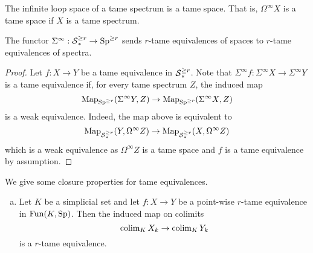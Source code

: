 \begin{remark}
		The infinite loop space of a tame spectrum is a tame space. That is, $\Omega^{\infty}X$ is a tame space if $X$ is a tame spectrum.
\end{remark}




\begin{lemma}
\label{Suspension preserves tame equivalence}
	The functor $\Sigma^{\infty}:\operatorname{\mathcal{S}}^{\geq r}_{*} \to \operatorname{Sp}^{\geq r}$ sends $r$-tame equivalences of spaces to $r$-tame equivalences of spectra.
\end{lemma}
\begin{proof}
	Let $f:X\to Y$ be a tame equivalence in $\operatorname{\mathcal{S}}^{\geq r}_{*}$. Note that $\Sigma^{\infty}f: \Sigma^{\infty}X \to \Sigma^{\infty}Y$ is a tame equivalence if, for every tame spectrum $Z$, the induced map
	$$
	\operatorname{Map}_{\operatorname{Sp}^{\geq r}}(\Sigma^{\infty} Y, Z) \to 	\operatorname{Map}_{\operatorname{Sp}^{\geq r}}(\Sigma^{\infty} X, Z)
	$$
	is a weak equivalence. Indeed, the map above is equivalent to 
	$$
	\operatorname{Map}_{\operatorname{\mathcal{S}}^{\geq r}_{*}}(Y, \Omega^{\infty} Z) \to 	\operatorname{Map}_{\operatorname{\mathcal{S}}^{\geq r}_{*}}(X, \Omega^{\infty} Z)
	$$
	which is a weak equivalence as $\Omega^{\infty}Z$ is a tame space and $f$ is a tame equivalence by assumption.
\end{proof}

We give some closure properties for tame equivalences.
\begin{lemma}
\label{closure property of tame equivalences}
	\begin{enumerate}[(a)]
		\item Let $K$ be a simplicial set and let $f:X\to Y$ be a point-wise $r$-tame equivalence in $\operatorname{Fun}(K,\operatorname{Sp})$.
	Then the induced map on colimits 
		$$
		\operatorname{colim}_{K}X_k \to \operatorname{colim}_{K}Y_k
		$$ is a $r$-tame equivalence.
	\end{enumerate}
\end{lemma}

